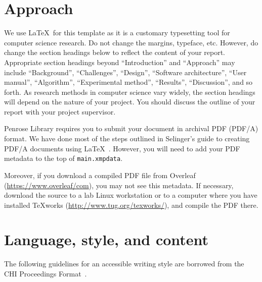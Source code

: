 \documentclass{article}
\begin{document}
\section{Approach}

We use \LaTeX\ for this template as it is a customary typesetting tool for computer science research. Do not change the margins, typeface, etc. However, do change the section headings below to reflect the content of your report. Appropriate section headings beyond ``Introduction'' and ``Approach'' may include ``Background'', ``Challenges'', ``Design'', ``Software architecture'', ``User manual'', ``Algorithm'', ``Experimental method'', ``Results'', ``Discussion'',  and so forth. As research methods in computer science vary widely, the section headings will depend on the nature of your project. You should discuss the outline of your report with your project supervisor.

Penrose Library requires you to submit your document in archival PDF (PDF/A) format.  We have done most of the steps outlined in Selinger's guide to creating PDF/A documents using \LaTeX~\cite{Selinger:pdfa}. However, you will need to add your PDF metadata to the top of \texttt{main.xmpdata}. 

Moreover, if you download a compiled PDF file from Overleaf (\url{https://www.overleaf/com}), you may not see this metadata. 
If necessary, download the source to a lab Linux workstation or to a computer where you have installed TeXworks (\url{http://www.tug.org/texworks/}), and compile the PDF there.  

\section{Language, style, and content}

The following guidelines for an accessible writing style are borrowed from the CHI Proceedings Format~\cite{CHI}.
\end{document}
